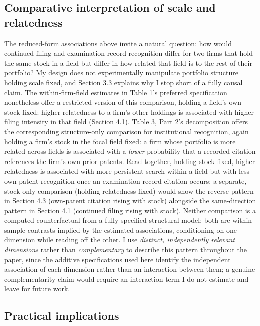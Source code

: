 \documentclass[12pt]{article}
\begin{document}
\subsection{Comparative interpretation of scale and relatedness}

The reduced-form associations above invite a natural question: how would continued filing and examination-record recognition differ for two firms that hold the same stock in a field but differ in how related that field is to the rest of their portfolio? My design does not experimentally manipulate portfolio structure holding scale fixed, and Section 3.3 explains why I stop short of a fully causal claim. The within-firm-field estimates in Table 1's preferred specification nonetheless offer a restricted version of this comparison, holding a field's own stock fixed: higher relatedness to a firm's other holdings is associated with higher filing intensity in that field (Section 4.1). Table 3, Part 2's decomposition offers the corresponding structure-only comparison for institutional recognition, again holding a firm's stock in the focal field fixed: a firm whose portfolio is more related across fields is associated with a \emph{lower} probability that a recorded citation references the firm's own prior patents. Read together, holding stock fixed, higher relatedness is associated with more persistent search within a field but with less own-patent recognition once an examination-record citation occurs; a separate, stock-only comparison (holding relatedness fixed) would show the reverse pattern in Section 4.3 (own-patent citation rising with stock) alongside the same-direction pattern in Section 4.1 (continued filing rising with stock). Neither comparison is a computed counterfactual from a fully specified structural model; both are within-sample contrasts implied by the estimated associations, conditioning on one dimension while reading off the other. I use \emph{distinct, independently relevant dimensions} rather than \emph{complementary} to describe this pattern throughout the paper, since the additive specifications used here identify the independent association of each dimension rather than an interaction between them; a genuine complementarity claim would require an interaction term I do not estimate and leave for future work.

\subsection{Practical implications}
\end{document}
